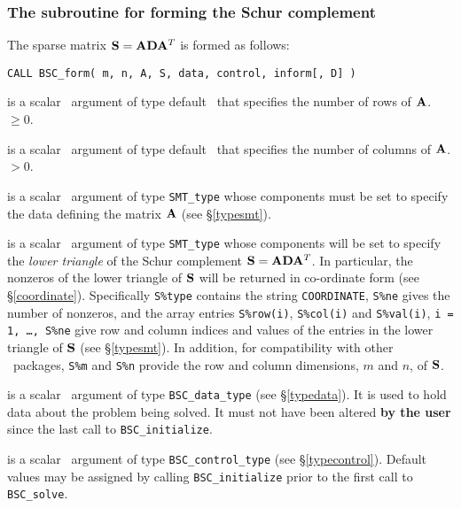 \documentclass{galahad}
\newcommand{\packagename}{BSC}
\begin{document}

\subsubsection{The subroutine for forming the Schur complement}
The sparse matrix ${\mathbf{S}} = {\mathbf{A}} {\mathbf{D}} {\mathbf{A}}^T$ is formed as follows:
\vspace*{1mm}

\hspace{8mm}
{\tt CALL \packagename\_form( m, n, A, S, data, control, inform[, D] )}

\begin{description}
 is a scalar \intentin\ argument of type default \integer\ that specifies
the number of rows of ${\mathbf{A}}$. 
 $\geq 0$.

 is a scalar \intentin\ argument of type default \integer\ that specifies
the number of columns of ${\mathbf{A}}$.
 $> 0$.

 is a scalar \intentin\ argument of type {\tt SMT\_type} whose
components must be set to specify the data defining the matrix ${\mathbf{A}}$ 
(see \S\ref{typesmt}).

 is a scalar \intentout\ argument of type {\tt SMT\_type} whose
components will be set to specify the {\em lower triangle} of the 
Schur complement ${\mathbf{S}} = {\mathbf{A}} {\mathbf{D}} {\mathbf{A}}^T$. In particular, 
the nonzeros of the lower triangle of ${\mathbf{S}}$ will be returned
in co-ordinate form (see \S\ref{coordinate}). Specifically
{\tt S\%type} contains the string 
{\tt COORDINATE}, {\tt S\%ne} gives the number of nonzeros,
and the array entries {\tt S\%row(i)}, {\tt S\%col(i)} and 
{\tt S\%val(i)}, {\tt i = 1, \ldots, S\%ne} give row and column
indices and values of the entries in the lower triangle of ${\mathbf{S}}$
(see \S\ref{typesmt}). In addition, for compatibility with other
\galahad\ packages, {\tt S\%m} and {\tt S\%n} provide the row and column
dimensions, $m$ and $n$, of ${\mathbf{S}}$.

 is a scalar \intentinout\ argument of type 
{\tt \packagename\_data\_type}
(see \S\ref{typedata}). It is used to hold data about the problem being 
solved. It must not have been altered {\bf by the user} since the last call to 
{\tt \packagename\_initialize}.

 is a scalar \intentin\ argument of type 
{\tt \packagename\_control\_type}
(see \S\ref{typecontrol}). Default values may be assigned by calling 
{\tt \packagename\_initialize} prior to the first call to 
{\tt \packagename\_solve}.


\end{description}
\end{document}
